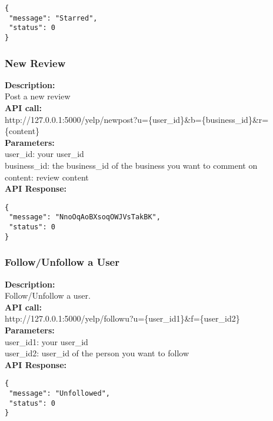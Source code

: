\documentclass[12pt]{article}
\begin{document}
\begin{singlespacing}
\begin{lstlisting}
{
 "message": "Starred",
 "status": 0
}
\end{lstlisting}
\end{singlespacing}

\subsubsection{New Review}
\textbf{Description:}\\
Post a new review\\
\textbf{API call:}\\
http://127.0.0.1:5000/yelp/newpost?u=\{user\_id\}\&b=\{business\_id\}\&r=\{content\}\\
\textbf{Parameters:}\\
user\_id: your user\_id\\
business\_id: the business\_id of the business you want to comment on\\
content: review content\\
\textbf{API Response:}

\begin{singlespacing}
\begin{lstlisting}
{
 "message": "NnoOqAoBXsoqOWJVsTakBK",
 "status": 0
}
\end{lstlisting}
\end{singlespacing}

\subsubsection{Follow/Unfollow a User}
\textbf{Description:}\\
Follow/Unfollow a user.\\
\textbf{API call:}\\
http://127.0.0.1:5000/yelp/followu?u=\{user\_id1\}\&f=\{user\_id2\}\\
\textbf{Parameters:}\\
user\_id1: your user\_id\\
user\_id2: user\_id of the person you want to follow\\
\textbf{API Response:}

\begin{singlespacing}
\begin{lstlisting}
{
 "message": "Unfollowed",
 "status": 0
}
\end{lstlisting}
\end{singlespacing}
\end{document}
